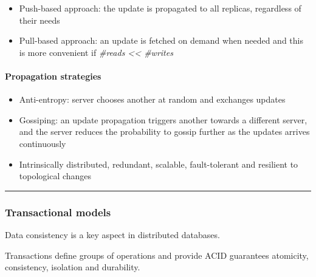 \begin{itemize}
\itemsep1pt\parskip0pt
\item
  Push-based approach: the update is propagated to all replicas,
  regardless of their needs
\item
  Pull-based approach: an update is fetched on demand when needed and
  this is more convenient if \emph{\#reads \textless{}\textless{}
  \#writes}
\end{itemize}

\paragraph{Propagation strategies}\label{propagation-strategies}

\begin{itemize}
\itemsep1pt\parskip0pt
\item
  Anti-entropy: server chooses another at random and exchanges updates
\item
  Gossiping: an update propagation triggers another towards a different
  server, and the server reduces the probability to gossip further as
  the updates arrives continuously
\item
  Intrinsically distributed, redundant, scalable, fault-tolerant and
  resilient to topological changes
\end{itemize}

\begin{center}\rule{3in}{0.4pt}\end{center}

\subsubsection{Transactional models}\label{transactional-models}

Data consistency is a key aspect in distributed databases.

Transactions define groups of operations and provide ACID guarantees
atomicity, consistency, isolation and durability.
